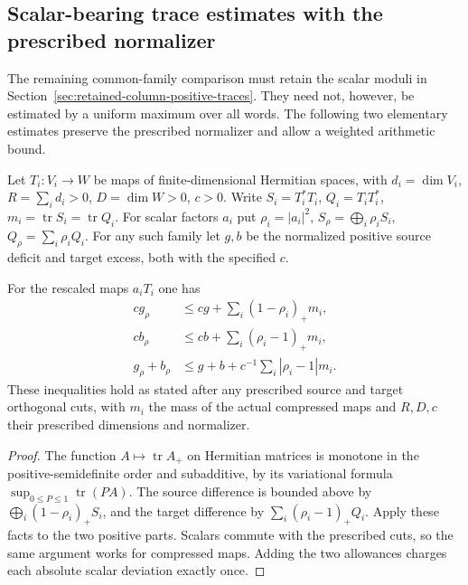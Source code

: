 \subsection{Scalar-bearing trace estimates with the prescribed normalizer}
\label{sec:retained-scalar-weighted-traces}

The remaining common-family comparison must retain the scalar
moduli in Section~\ref{sec:retained-column-positive-traces}.
They need not, however, be estimated by a uniform maximum
over all words. The following two elementary estimates
preserve the prescribed normalizer and allow a weighted
arithmetic bound.

Let \(T_i:V_i\to W\) be maps of finite-dimensional Hermitian
spaces, with \(d_i=\dim V_i\), \(R=\sum_i d_i>0\),
\(D=\dim W>0\), \(c>0\). Write
\(S_i=T_i^*T_i\), \(Q_i=T_iT_i^*\),
\(m_i=\operatorname{tr}S_i=\operatorname{tr}Q_i\).
For scalar factors \(a_i\) put \(\rho_i=|a_i|^2\),
\(S_\rho=\bigoplus_i\rho_i S_i\), \(Q_\rho=\sum_i\rho_i Q_i\).
For any such family let \(g,b\) be the normalized positive
source deficit and target excess, both with the specified \(c\).

\begin{proposition}
\label{prop:retained-weighted-scalar-stability}
For the rescaled maps \(a_iT_i\) one has
\[
 \begin{split}
 c g_\rho&\le cg+\sum_i(1-\rho_i)_+m_i,\\
 c b_\rho&\le cb+\sum_i(\rho_i-1)_+m_i,\\
 g_\rho+b_\rho&\le g+b+c^{-1}\sum_i|\rho_i-1|m_i .
 \end{split}                                                       \tag{ST1}
\]
These inequalities hold as stated after any prescribed
source and target orthogonal cuts, with \(m_i\) the
mass of the actual compressed maps and \(R,D,c\) their
prescribed dimensions and normalizer.
\end{proposition}
\begin{proof}
The function \(A\mapsto\operatorname{tr}A_+\) on Hermitian
matrices is monotone in the positive-semidefinite order
and subadditive, by its variational formula
\(\sup_{0\le P\le1}\operatorname{tr}(PA)\).
The source difference is bounded above by
\(\bigoplus_i(1-\rho_i)_+S_i\), and the target difference
by \(\sum_i(\rho_i-1)_+Q_i\).
Apply these facts to the two positive parts. Scalars
commute with the prescribed cuts, so the same argument
works for compressed maps. Adding the two allowances
charges each absolute scalar deviation exactly once.
\end{proof}

